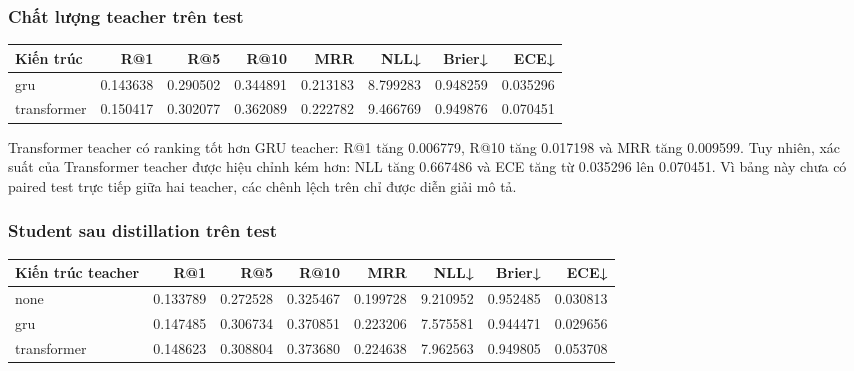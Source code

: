 \subsubsection*{Chất lượng teacher trên test}

\begin{table}[!htbp]
\centering
\scriptsize
\setlength{\tabcolsep}{2.5pt}
\begin{adjustbox}{max width=\textwidth}
\begin{tabular}{@{}lrrrrrrr@{}}
\toprule
Kiến trúc & R@1 & R@5 & R@10 & MRR & NLL↓ & Brier↓ & ECE↓ \\
\midrule
gru & 0.143638 & 0.290502 & 0.344891 & 0.213183 & 8.799283 & 0.948259 & 0.035296 \\
transformer & 0.150417 & 0.302077 & 0.362089 & 0.222782 & 9.466769 & 0.949876 & 0.070451 \\
\bottomrule
\end{tabular}
\end{adjustbox}
\end{table}

Transformer teacher có ranking tốt hơn GRU teacher: R@1 tăng 0.006779, R@10 tăng 0.017198 và MRR tăng 0.009599. Tuy nhiên, xác suất của Transformer teacher được hiệu chỉnh kém hơn: NLL tăng 0.667486 và ECE tăng từ 0.035296 lên 0.070451. Vì bảng này chưa có paired test trực tiếp giữa hai teacher, các chênh lệch trên chỉ được diễn giải mô tả.

\subsubsection*{Student sau distillation trên test}

\begin{table}[!htbp]
\centering
\scriptsize
\setlength{\tabcolsep}{2.5pt}
\begin{adjustbox}{max width=\textwidth}
\begin{tabular}{@{}lrrrrrrr@{}}
\toprule
Kiến trúc teacher & R@1 & R@5 & R@10 & MRR & NLL↓ & Brier↓ & ECE↓ \\
\midrule
none & 0.133789 & 0.272528 & 0.325467 & 0.199728 & 9.210952 & 0.952485 & 0.030813 \\
gru & 0.147485 & 0.306734 & 0.370851 & 0.223206 & 7.575581 & 0.944471 & 0.029656 \\
transformer & 0.148623 & 0.308804 & 0.373680 & 0.224638 & 7.962563 & 0.949805 & 0.053708 \\
\bottomrule
\end{tabular}
\end{adjustbox}
\end{table}

